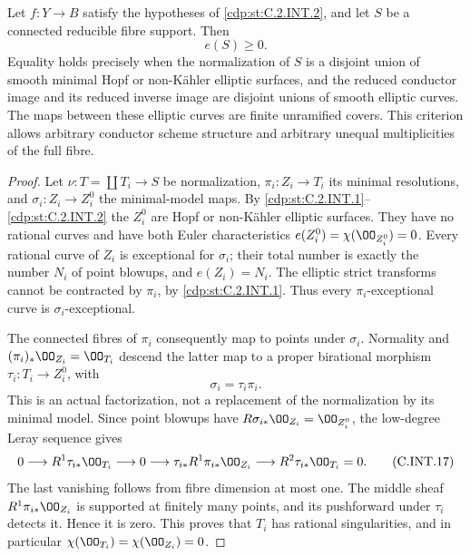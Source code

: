 
\begin{proposition}\label{cdp:st:C.2.INT.3}

Let $f:Y\to B$ satisfy the hypotheses of \ref{cdp:st:C.2.INT.2},
and let $S$ be a connected reducible fibre support.
Then
\[
 e(S)\ge0.
 \tag{C.INT.15}\label{cdp:eq:C.INT.15}
\]
Equality holds precisely when the normalization of $S$
is a disjoint union of smooth minimal Hopf or
non-K\"ahler elliptic surfaces, and the reduced
conductor image and its reduced inverse image are
disjoint unions of smooth elliptic curves. The maps
between these elliptic curves are finite unramified
covers. This criterion allows arbitrary conductor
scheme structure and arbitrary unequal multiplicities
of the full fibre.
\end{proposition}
\begin{proof}
Let $\nu:T=\coprod T_i\to S$ be normalization,
$\pi_i:Z_i\to T_i$ its minimal resolutions, and
$\sigma_i:Z_i\to Z_i^0$ the minimal-model maps.
By \ref{cdp:st:C.2.INT.1}--\ref{cdp:st:C.2.INT.2} the $Z_i^0$ are Hopf or
non-K\"ahler elliptic surfaces. They have no rational
curves and have both Euler characteristics
$e(Z_i^0)=\chi(\OO_{Z_i^0})=0$.
Every rational curve of $Z_i$ is exceptional for
$\sigma_i$; their total number is exactly the number
$N_i$ of point blowups, and $e(Z_i)=N_i$.
The elliptic strict transforms cannot be contracted
by $\pi_i$, by \ref{cdp:st:C.2.INT.1}. Thus every
$\pi_i$-exceptional curve is $\sigma_i$-exceptional.

The connected fibres of $\pi_i$ consequently map to
points under $\sigma_i$. Normality and
$(\pi_i)_*\OO_{Z_i}=\OO_{T_i}$ descend the latter
map to a proper birational morphism
$\tau_i:T_i\to Z_i^0$, with
\[
 \sigma_i=\tau_i\pi_i.
 \tag{C.INT.16}\label{cdp:eq:C.INT.16}
\]
This is an actual factorization, not a replacement
of the normalization by its minimal model.
Since point blowups have $R\sigma_{i*}\OO_{Z_i}
=\OO_{Z_i^0}$, the low-degree Leray sequence gives
\[
 0\longrightarrow R^1\tau_{i*}\OO_{T_i}
 \longrightarrow 0
 \longrightarrow \tau_{i*}R^1\pi_{i*}\OO_{Z_i}
 \longrightarrow R^2\tau_{i*}\OO_{T_i}=0.
 \tag{C.INT.17}\label{cdp:eq:C.INT.17}
\]
The last vanishing follows from fibre dimension at
most one. The middle sheaf $R^1\pi_{i*}\OO_{Z_i}$
is supported at finitely many points, and its
pushforward under $\tau_i$ detects it. Hence it is
zero. This proves that $T_i$ has rational
singularities, and in particular
$\chi(\OO_{T_i})=\chi(\OO_{Z_i})=0$.


\end{proof}
